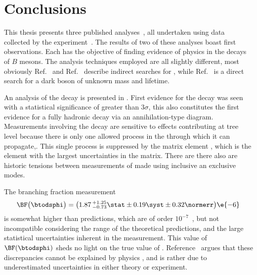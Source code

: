 \chapter{Conclusions}
\label{ch:conc}

This thesis presents three published
analyses~\cite{LHCb-PAPER-2012-025,LHCb-PAPER-2014-030,LHCb-PAPER-2015-036}, all
undertaken using data collected by the \lhcb experiment~\cite{Alves:2008zz}.
The results of two of these analyses boast first observations.
Each has the objective of finding evidence of physics \bsm in the decays of $B$ mesons.
The analysis techniques employed are all slightly different, most obviously
Ref.~\cite{LHCb-PAPER-2012-025} and Ref.~\cite{LHCb-PAPER-2014-030} describe indirect
searches for \np, while Ref.~\cite{LHCb-PAPER-2015-036} is a direct search for a dark boson of
unknown mass and lifetime.

An analysis of the decay \btodsphi is presented in .
First evidence for the decay was seen with a statistical significance of greater than $3\sigma$,
this also constitutes the first evidence for a fully hadronic decay via an annihilation-type
diagram.
Measurements involving the decay \btodsphi are sensitive to \np effects contributing at tree level
because there is only one allowed process in the \sm through which it can propagate,.
This single process is suppressed by the \ckm matrix element , which is the element with the
largest uncertainties in the \ckm matrix.
There are there also are historic tensions
between measurements of  made using inclusive an exclusive modes.

The branching fraction measurement
\begin{equation*}
  \BF\big(\btodsphi\big) =
  \big(1.87\,^{+1.25}_{-0.73}\stat\pm0.19\syst\pm0.32\normerr\big)\e{-6}
\end{equation*}
is somewhat higher than \sm predictions, which are
of order $10^{-7}$~\cite{Zou:2009zza,Mohanta:2002wf,PhysRevD.76.057701,Lu:2001yz}, but
not incompatible considering the range of the theoretical predictions, and the large
statistical uncertainties inherent in the measurement.
This value of $\BF(\btodsphi)$ sheds no light on the true value of .
Reference~\cite{Crivellin:2014zpa} argues that these
discrepancies cannot be explained by physics \bsm, and is rather due to underestimated
uncertainties in either theory or experiment.

